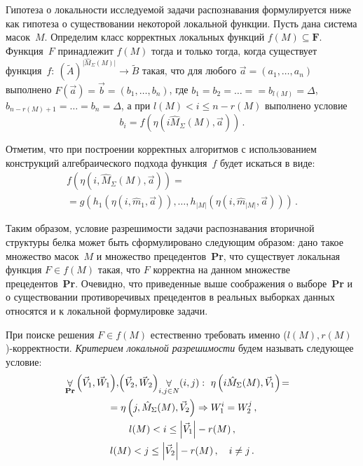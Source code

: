 \begin{multicols}{2}
    Гипотеза о локальности исследуемой задачи распознавания 
формулируется ниже как гипотеза о существовании некоторой локальной 
функции. Пусть дана система масок~$M$. Определим класс корректных 
локальных функций $f(M)\subseteq \mathbf{F}$. Функция~$F$ принадлежит 
$f(M)$ тогда и только тогда, когда существует функция~$f:\ \left(\tilde{A}\right) 
^{\vert \hat{M}_\Sigma(M)\vert} \rightarrow \tilde{B}$ такая, что для любого 
$\vec{a}=(a_1, \ldots ,a_n)$ выполнено $F(\vec{a})=\vec{b}=(b_1, \ldots , b_n)$, где 
$b_1=b_2=\ldots =$\linebreak $= b_{l(M)}=\Delta$, $b_{n-r(M)+1}=\ldots = b_n=\Delta$, а при 
$l(M)<i\leq n-r(M)$ выполнено условие
\begin{equation}
b_i  =f\left(\eta\left( i \hat{M}_\Sigma(M),\vec{a}\right)\right)\,.
\label{e5tor}
\end{equation}

Отметим, что при построении корректных алгоритмов с использованием 
конструкций алгебраического подхода функция~$f$ будет искаться в виде:
\begin{multline*}
f\left(\eta \left(i, \hat{M}_\Sigma (M),\vec{a}\right)\right) ={}
\\
{}=
g\left( h_1\left(\eta \left(i, \hat{m}_1,\vec{a}\right)\right), \ldots , h_{\vert M\vert} 
\left( \eta\left (i, \hat{m}_{\vert M\vert}, \vec{a}\right)\right)\right)\,.
\end{multline*}

Таким образом, условие разрешимости задачи распознавания вторичной 
структуры белка может быть сформулировано следующим образом: дано такое 
множество масок~$M$ и множество прецедентов~\textbf{Pr}, что существует 
локальная функция $F\in f(M)$ такая, что $F$ корректна на данном множестве 
прецедентов~\textbf{Pr}. Очевидно, что приведенные выше соображения о 
выборе~\textbf{Pr} и о существовании противоречивых прецедентов в реальных 
выборках данных относятся и к локальной формулировке за\-дачи.

    При поиске решения $F\in f(M)$ естественно требовать именно 
($l(M),r(M)$)-кор\-рект\-ности. \textit{Критерием локальной разрешимости} 
будем называть следующее условие:
\begin{multline}
\!\!\!\!\!\!\forallb\limits_{\mathbf{Pr}} \left(\vec{V}_1,\vec{W}_1\right)\!, \!
\left(\vec{V}_2,\vec{W}_2\right)\! \forallb\limits_{i,j\in N} (i,j): \ \eta \left(i 
\hat{M}_\Sigma (M),\vec{V}_1\right)\!=\\
{}=\eta\left( j, 
\hat{M}_\Sigma(M),\vec{V}_2\right) \Rightarrow W_1^i=W_2^j\,,\\ 
l(M)<i\leq \left | \vec{V}_1\right | -r(M)\,,\\ l(M)<j\leq \left | \vec{V}_2\right | -
r(M)\,,\quad i\not=j\,.
\label{e6tor}
\end{multline}
        

\end{multicols}
